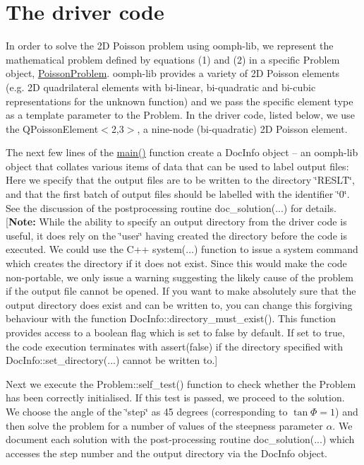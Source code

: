  

\hypertarget{index_main}{}\section{The driver code}\label{index_main}
In order to solve the 2D Poisson problem using {\ttfamily oomph-\/lib}, we represent the mathematical problem defined by equations (1) and (2) in a specific {\ttfamily Problem} object, {\ttfamily \hyperlink{classPoissonProblem}{Poisson\+Problem}}. {\ttfamily oomph-\/lib} provides a variety of 2D Poisson elements (e.\+g. 2D quadrilateral elements with bi-\/linear, bi-\/quadratic and bi-\/cubic representations for the unknown function) and we pass the specific element type as a template parameter to the {\ttfamily Problem}. In the driver code, listed below, we use the {\ttfamily Q\+Poisson\+Element$<$2,3$>$}, a nine-\/node (bi-\/quadratic) 2D Poisson element.

The next few lines of the {\ttfamily \hyperlink{two__d__poisson_8cc_ae66f6b31b5ad750f1fe042a706a4e3d4}{main()}} function create a {\ttfamily Doc\+Info} object -- an {\ttfamily oomph-\/lib} object that collates various items of data that can be used to label output files\+: Here we specify that the output files are to be written to the directory \char`\"{}\+R\+E\+S\+L\+T\char`\"{}, and that the first batch of output files should be labelled with the identifier \char`\"{}0\char`\"{}. See the discussion of the postprocessing routine {\ttfamily doc\+\_\+solution}(...) for details. \mbox{[}{\bfseries Note\+:} While the ability to specify an output directory from the driver code is useful, it does rely on the \char`\"{}user\char`\"{} having created the directory before the code is executed. We could use the C++ {\ttfamily system}(...) function to issue a system command which creates the directory if it does not exist. Since this would make the code non-\/portable, we only issue a warning suggesting the likely cause of the problem if the output file cannot be opened. If you want to make absolutely sure that the output directory does exist and can be written to, you can change this forgiving behaviour with the function {\ttfamily Doc\+Info\+::directory\+\_\+must\+\_\+exist()}. This function provides access to a boolean flag which is set to {\ttfamily false} by default. If set to {\ttfamily true}, the code execution terminates with {\ttfamily assert(false)} if the directory specified with {\ttfamily Doc\+Info\+::set\+\_\+directory}(...) cannot be written to.\mbox{]}

Next we execute the {\ttfamily Problem\+::self\+\_\+test()} function to check whether the {\ttfamily Problem} has been correctly initialised. If this test is passed, we proceed to the solution. We choose the angle of the \char`\"{}step\char`\"{} as 45 degrees (corresponding to $ \tan \Phi = 1 $) and then solve the problem for a number of values of the steepness parameter $ \alpha. $ We document each solution with the post-\/processing routine {\ttfamily doc\+\_\+solution}(...) which accesses the step number and the output directory via the {\ttfamily Doc\+Info} object.

